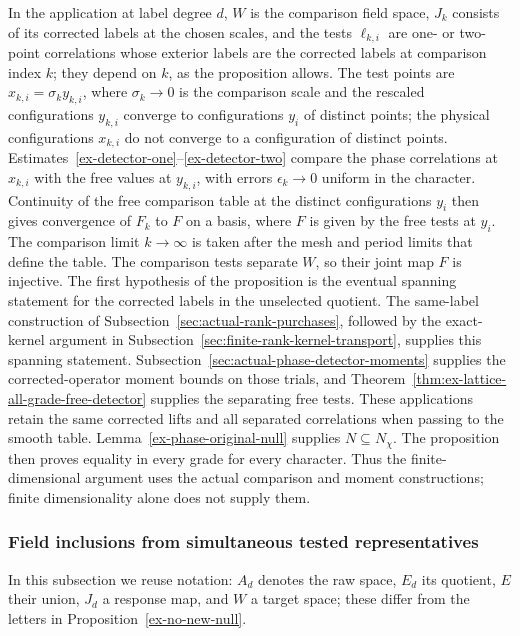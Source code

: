 In the application at label degree \(d\), \(W\) is the comparison
field space, \(J_k\) consists of its corrected labels at the chosen
scales, and the tests \(\ell_{k,i}\) are one- or two-point correlations
whose exterior labels are the corrected labels at comparison index \(k\);
they depend on \(k\), as the proposition allows. The test points are
\(x_{k,i}=\sigma_ky_{k,i}\), where \(\sigma_k\to0\) is the comparison scale
and the rescaled configurations \(y_{k,i}\) converge to configurations
\(y_i\) of distinct points; the physical configurations \(x_{k,i}\) do not
converge to a configuration of distinct points.
Estimates~\eqref{ex-detector-one}--\eqref{ex-detector-two} compare the
phase correlations at \(x_{k,i}\) with the free values at \(y_{k,i}\), with
errors \(\epsilon_k\to0\) uniform in the character. Continuity of the free
comparison table at the distinct configurations \(y_i\) then gives
convergence of \(F_k\) to \(F\) on a basis, where \(F\) is given by the free
tests at \(y_i\). The comparison limit \(k\to\infty\) is taken after the
mesh and period limits that define the table. The comparison tests separate \(W\), so
their joint map \(F\) is injective. The first hypothesis of the
proposition is the eventual spanning statement for the corrected labels
in the unselected quotient. The same-label construction of
Subsection~\ref{sec:actual-rank-purchases}, followed by the exact-kernel
argument in Subsection~\ref{sec:finite-rank-kernel-transport}, supplies
this spanning statement. Subsection~\ref{sec:actual-phase-detector-moments}
supplies the corrected-operator moment bounds on those trials, and
Theorem~\ref{thm:ex-lattice-all-grade-free-detector} supplies the
separating free tests. These applications retain the same corrected
lifts and all separated correlations when passing to the smooth table.
Lemma~\ref{ex-phase-original-null} supplies $N\subseteq N_\chi$.
The proposition then proves equality in every grade for every character.
Thus the finite-dimensional argument uses the actual comparison and
moment constructions; finite dimensionality alone does not supply them.

\subsubsection{Field inclusions from simultaneous tested representatives}
\label{subsec:phase-field-inclusions}

In this subsection we reuse notation: $A_d$ denotes the raw space, $E_d$
its quotient, $E$ their union, $J_d$ a response map, and $W$ a target
space; these differ from the letters in Proposition~\ref{ex-no-new-null}.


